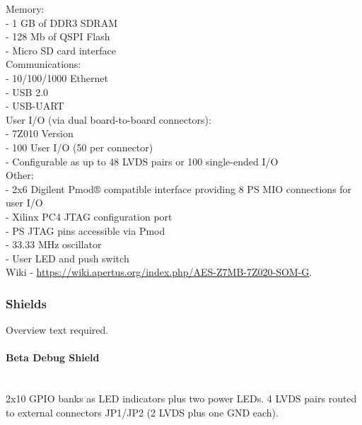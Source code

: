     
Memory:\\

- 1 GB of DDR3 SDRAM\\
- 128 Mb of QSPI Flash\\
- Micro SD card interface\\


Communications:\\

- 10/100/1000 Ethernet\\
- USB 2.0\\
- USB-UART\\

User I/O (via dual board-to-board connectors):\\

- 7Z010 Version\\
- 100 User I/O (50 per connector)\\
- Configurable as up to 48 LVDS pairs or 100 single-ended I/O\\

Other:\\

- 2x6 Digilent Pmod® compatible interface providing 8 PS MIO connections for user I/O\\
- Xilinx PC4 JTAG configuration port\\
- PS JTAG pins accessible via Pmod\\
- 33.33 MHz oscillator\\
- User LED and push switch\\


Wiki - \href{https://wiki.apertus.org/index.php/AES-Z7MB-7Z020-SOM-G}{https://wiki.apertus.org/index.php/AES-Z7MB-7Z020-SOM-G}.\\







\subsubsection{Shields}

Overview text required.\\

\paragraph{Beta Debug Shield}\mbox{}\\

2x10 GPIO banks as LED indicators plus two power LEDs. 4 LVDS pairs routed to external connectors JP1/JP2 (2 LVDS plus one GND each). 

